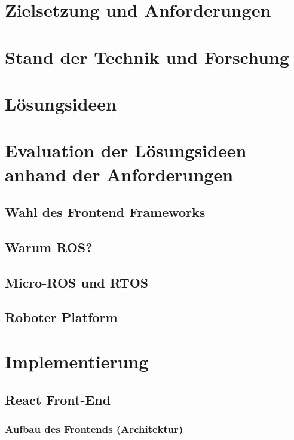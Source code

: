 \documentclass[11pt,twoside,a4paper,titlepage]{article}
\begin{document}
\section{Zielsetzung und Anforderungen}


\section{Stand der Technik und Forschung}


\section{Lösungsideen}


\section{Evaluation der Lösungsideen anhand der Anforderungen}

\subsection{Wahl des Frontend Frameworks}


\subsection{Warum ROS?}


\subsection{Micro-ROS und RTOS}



\subsection{Roboter Platform}


\section{Implementierung}

\subsection{React Front-End}
\subsubsection{Aufbau des Frontends (Architektur)}

\end{document}
